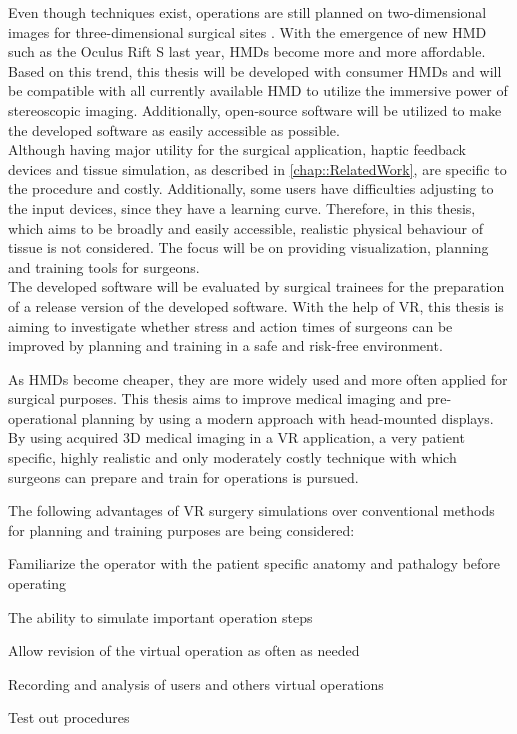 Even though techniques exist, operations are still planned on two-dimensional images for three-dimensional surgical sites \cite{Steinbacher.2015}.
With the emergence of new HMD such as the Oculus Rift S last year, HMDs become more and more affordable.
Based on this trend, this thesis will be developed with consumer HMDs and will be compatible with all currently available HMD to utilize the immersive power of stereoscopic imaging.
Additionally, open-source software will be utilized to make the developed software as easily accessible as possible. 
\\ Although having major utility for the surgical application, haptic feedback devices and tissue simulation, as described in \ref{chap::RelatedWork}, are specific to the procedure and costly.
Additionally, some users have difficulties adjusting to the input devices, since they have a learning curve.
Therefore, in this thesis, which aims to be broadly and easily accessible, realistic physical behaviour of tissue is not considered.
The focus will be on providing visualization, planning and training tools for surgeons.
\\ The developed software will be evaluated by surgical trainees for the preparation of a release version of the developed software.
With the help of VR, this thesis is aiming to investigate whether stress and action times of surgeons can be improved by planning and training in a safe and risk-free environment.

As HMDs become cheaper, they are more widely used and more often applied for surgical purposes.
This thesis aims to improve medical imaging and pre-operational planning by using a modern approach with head-mounted displays.
By using acquired 3D medical imaging in a VR application, a very patient specific, highly realistic and only moderately costly technique with which surgeons can prepare and train for operations is pursued.

The following advantages of VR surgery simulations over conventional methods for planning and training purposes are being considered:
\begin{compactenum}[label=(\alph*)]
    \item Familiarize the operator with the patient specific anatomy and pathalogy before operating
    \item The ability to simulate important operation steps
    \item Allow revision of the virtual operation as often as needed
    \item Recording and analysis of users and others virtual operations
    \item Test out procedures
\end{compactenum}


